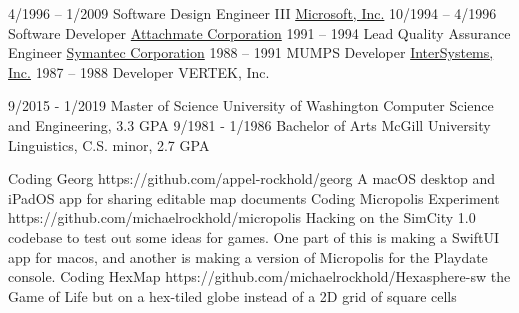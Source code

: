 \documentclass[9pt]{developercv} %
\begin{document}
\begin{entrylist}
  		{\vspace{-10pt}}
	\entry
        {4/1996 -- 1/2009}
		{Software Design Engineer III}
		{\href{https://nordstrom.com/}{Microsoft, Inc.}}
  		{\vspace{-10pt}}
	\entry
        {10/1994 -- 4/1996}
		{Software Developer}
		{\href{https://attachmate.com/}{Attachmate Corporation}}
  		{\vspace{-10pt}}
	\entry
        {1991 -- 1994}
		{Lead Quality Assurance Engineer}
		{\href{https://symantec.com/}{Symantec Corporation}}
  		{\vspace{-10pt}}
	\entry
        {1988 -- 1991}
		{MUMPS Developer}
		{\href{https://intersystems.com/}{InterSystems, Inc.}}
  		{\vspace{-10pt}}
	\entry
        {1987 -- 1988}
		{Developer}
		{VERTEK, Inc.}
  		{\vspace{-10pt}}
\end{entrylist}

\vspace{-10 pt}
\begin{entrylist}
    \entry
		{9/2015 - 1/2019}
		{Master of Science}
		{University of Washington}
		{Computer Science and Engineering, 3.3 GPA}
    \entry
		{9/1981 - 1/1986}
		{Bachelor of Arts}
		{McGill University}
		{Linguistics, C.S. minor, 2.7 GPA}
\end{entrylist}

\newpage
\begin{entrylist}
	\entry
		{Coding}
		{Georg}
		{https://github.com/appel-rockhold/georg}
		{A macOS desktop and iPadOS app for sharing editable map documents}
	\entry
		{Coding}
		{Micropolis Experiment}
		{https://github.com/michaelrockhold/micropolis}
		{Hacking on the SimCity 1.0 codebase to test out some ideas for games. One part of this is making a SwiftUI app for macos, and another is making a version of Micropolis for the Playdate console.}
    \entry
		{Coding}
		{HexMap}
		{https://github.com/michaelrockhold/Hexasphere-sw}
		{the Game of Life but on a hex-tiled globe instead of a 2D grid of square cells}
\end{entrylist}
\end{document}

